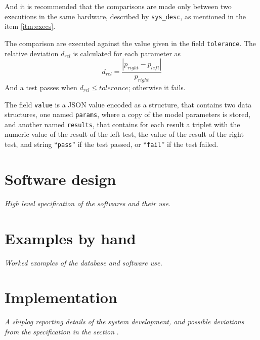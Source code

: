 \documentclass[a4paper,10pt]{article}
\begin{document}
\begin{enumerate}
        And it is recommended that the comparisons are made only
        between two executions in the same hardware, described
        by {\tt sys\_desc}, as mentioned in the item
        \ref{itm:execs}.

        The comparison are executed against the value given in the
        field {\tt tolerance}. The relative deviation $d_{rel}$
        is calculated for each parameter as
        \begin{equation*}
            d_{rel} = \frac{ |p_{right} - p_{left}| }{p_{right}}
        \end{equation*}
        And a test passes when $d_{rel} \leq tolerance$; otherwise
        it fails.

        The field {\tt value} is a JSON value encoded as a
        structure, that contains two data structures, one named
        {\tt params}, where a copy of the model parameters is
        stored, and another named {\tt results}, that contains for
        each result a triplet with the numeric value of the result
        of the left test, the value of the result of the right
        test, and string ``{\tt pass}'' if the test passed, or
        ``{\tt fail}'' if the test failed.

\end{enumerate}

\section{Software design}
\label{sec:design}

{\em High level specification of the softwares and their use.}

\section{Examples by hand}
\label{sec:by_hand}

{\em Worked examples of the database and software use.}

\section{Implementation}
\label{sec:impl}

{\em A shiplog reporting details of the system development, and
possible deviations from the specification in the section
}.
\end{document}
